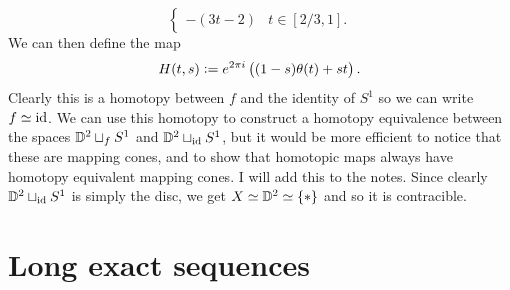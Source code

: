 \documentclass[11pt,a4paper]{article}
\begin{document}
\begin{solution}
\[\begin{cases}
      -(3t - 2) &t \in [2/3,1].
    \end{cases}
  \]
  We can then define the map
  \[
    H(t,s) := e^{2\pi i}\del{(1-s) \theta(t) + s t}.
  \]
  Clearly this is a homotopy between $f$ and the identity of $S^1$
  so we can write $f \simeq \operatorname{id}$.
  We can use this homotopy to construct
  a homotopy equivalence between the spaces
  $\mathbb{D}^2 \sqcup_f S^1$ and $\mathbb{D}^2 \sqcup_{\operatorname{id}} S^1$,
  but it would be more efficient to notice that these are mapping cones,
  and to show that homotopic maps always have homotopy equivalent mapping cones.
  I will add this to the notes.
  Since clearly $\mathbb{D}^2 \sqcup_{\operatorname{id}} S^1$ is simply the disc,
  we get $X \simeq \mathbb{D}^2 \simeq \left\{*\right\}$
  and so it is contracible.
\end{solution}


\section{Long exact sequences}
\end{document}
